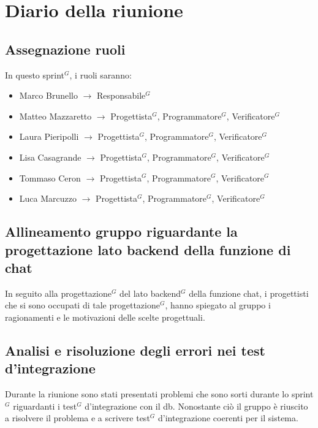 \section{Diario della riunione}

\subsection{Assegnazione ruoli}
In questo sprint$^G$, i ruoli saranno:
\begin{itemize}
	\item Marco Brunello $\rightarrow$ Responsabile$^G$
	\item Matteo Mazzaretto $\rightarrow$ Progettista$^G$, Programmatore$^G$, Verificatore$^G$
	\item Laura Pieripolli $\rightarrow$ Progettista$^G$, Programmatore$^G$, Verificatore$^G$
	\item Lisa Casagrande $\rightarrow$ Progettista$^G$, Programmatore$^G$, Verificatore$^G$
	\item Tommaso Ceron $\rightarrow$ Progettista$^G$, Programmatore$^G$, Verificatore$^G$
	\item Luca Marcuzzo $\rightarrow$ Progettista$^G$, Programmatore$^G$, Verificatore$^G$
\end{itemize}

\subsection{Allineamento gruppo riguardante la progettazione lato backend della funzione di chat}
In seguito alla progettazione$^G$ del lato backend$^G$ della funzione chat, i progettisti che si sono occupati di tale progettazione$^G$, hanno spiegato al gruppo i ragionamenti e le motivazioni delle scelte progettuali.


\subsection{Analisi e risoluzione degli errori nei test d'integrazione}
Durante la riunione sono stati presentati problemi che sono sorti durante lo sprint$^G$ riguardanti i test$^G$ d'integrazione con il db.
Nonostante ciò il gruppo è riuscito a risolvere il problema e a scrivere test$^G$ d'integrazione coerenti per il sistema.